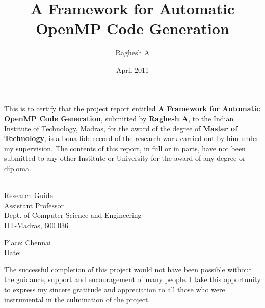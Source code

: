 \documentclass[MTech]{iitmdiss}
\def\thesistitle{A Framework for Automatic\\OpenMP Code Generation}
\def\thesisauthor{Raghesh A}
\begin{document}


\title{\thesistitle}

\author{\thesisauthor}

\date{April 2011}

\begin{singlespace}
\maketitle 
\end{singlespace} 



\certificate

\vspace*{0.5in}

\noindent This is to certify that the project report entitled %
{\bf {A Framework for Automatic OpenMP Code Generation}},
submitted by {\bf {\thesisauthor}}, to the Indian Institute of Technology, 
Madras, for the award of the degree of {\bf Master of Technology}, 
is a bona fide record of the research work carried out by him under my
supervision. The contents of this report, in full or in parts, have not been
submitted to any other Institute or University for the award of any degree or
diploma.

\vspace*{1.4in}
\hspace*{-0.25in}
\begin{singlespace}
 \\
\noindent Research Guide \\ 
\noindent Assistant Professor \\
\noindent Dept. of Computer Science and Engineering\\
\noindent IIT-Madras, 600 036 \\
\end{singlespace}
\vspace*{0.20in}
\noindent Place: Chennai\\ 
Date:

\acknowledgements
The successful completion of this project would not have been possible
without the guidance, support and encouragement of many people. I take
this opportunity to express my sincere gratitude and appreciation to all
those who were instrumental in the culmination of the project.
\end{document}
